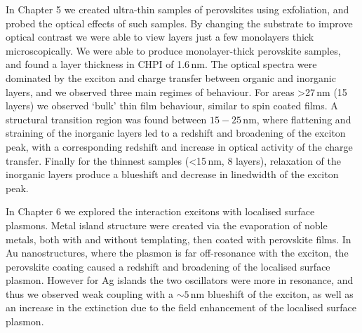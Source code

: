 In Chapter 5 we created ultra-thin samples of perovskites using exfoliation, and probed the optical effects of such samples. By changing the substrate to improve optical contrast we were able to view layers just a few monolayers thick microscopically. We were able to produce monolayer-thick perovskite samples, and found a layer thickness in CHPI of 1.6\,nm. The optical spectra were dominated by the exciton and charge transfer between organic and inorganic layers, and we observed three main regimes of behaviour. For areas >27\,nm (15 layers) we observed `bulk' thin film behaviour, similar to spin coated films. A structural transition region was found between $15-25$\,nm, where flattening and straining of the inorganic layers led to a redshift and broadening of the exciton peak, with a corresponding redshift and increase in optical activity of the charge transfer. Finally for the thinnest samples (<15\,nm, 8 layers), relaxation of the inorganic layers produce a blueshift and decrease in linedwidth of the exciton peak.

In Chapter 6 we explored the interaction excitons with localised surface plasmons. Metal island structure were created via the evaporation of noble metals, both with and without templating, then coated with perovskite films. In Au nanostructures, where the plasmon is far off-resonance with the exciton, the perovskite coating caused a redshift and broadening of the localised surface plasmon. However for Ag islands the two oscillators were more in resonance, and thus we observed weak coupling with a $\sim 5$\,nm blueshift of the exciton, as well as an increase in the extinction due to the field enhancement of the localised surface plasmon.

